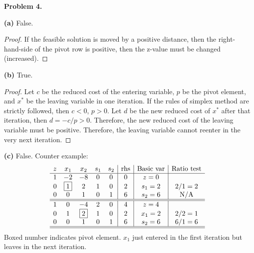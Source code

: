 \documentclass[12pt]{article}
\begin{document}
\noindent
\textbf{Problem 4.}

\noindent
\textbf{(a)}
False.
\begin{proof}
If the feasible solution is moved by a positive distance, then the right-hand-side of the pivot row is positive, then the z-value must be changed (increased).
\end{proof}

\noindent
\textbf{(b)}
True.
\begin{proof}
Let $c$ be the reduced cost of the entering variable, $p$ be the pivot element, and $x^*$ be the leaving variable in one iteration. If the rules of simplex method are strictly followed, then $c<0$, $p>0$. Let $d$ be the new reduced cost of $x^*$ after that iteration, then $d = -c/p > 0 $. Therefore, the new reduced cost of the leaving variable must be positive. Therefore, the leaving variable cannot reenter in the very next iteration.
\end{proof}

\noindent
\textbf{(c)}
False. Counter example:
\begin{equation*}
  \begin{array}{ccccc|c|c|c}
    z &  x_1      &  x_2 &  s_1 &  s_2 &   \text{rhs} & \text{Basic var} & \text{Ratio test} \\ \hline
    1 &   -2      &   -8 &    0 &    0 &     0        &  z=0             &                   \\
    0 & \boxed{1} &    2 &    1 &    0 &     2        &  s_1 = 2         & 2/1=2             \\
    0 &    0      &    1 &    0 &    1 &     6        &  s_2 = 6         & \text{N/A}        \\ \hline\hline
    
    1 &    0 &        -4 &    2 &    0 &     4        &  z=4             &                   \\
    0 &    1 & \boxed{2} &    1 &    0 &     2        &  x_1 = 2         & 2/2=1             \\
    0 &    0 &         1 &    0 &    1 &     6        &  s_2 = 6         & 6/1=6             \\ \hline\hline
  \end{array}
\end{equation*}
Boxed number indicates pivot element. $x_1$ just entered in the first iteration but leaves in the next iteration.
\end{document}
